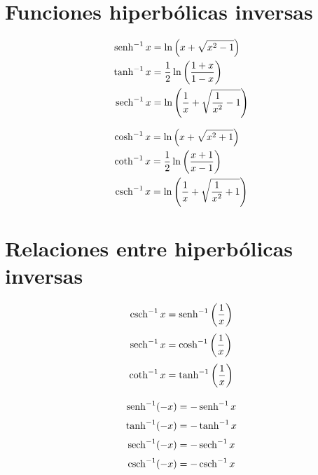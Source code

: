 \newpage

\section*{Funciones hiperbólicas inversas}

\begin{minipage}[c]{0.5\textwidth}
\begin{align*}
\operatorname{senh}^{-1} x &= \ln \left( x+ \sqrt{x^2-1} \right)\\
\tanh^{-1} x &= \frac{1}{2}\ln \left( \frac{1+x}{1-x} \right)\\
\operatorname{sech}^{-1} x &= \ln \left( \frac{1}{x}+ \sqrt{\frac{1}{x^2}-1} \right)
\end{align*}
\end{minipage}\begin{minipage}[c]{0.5\textwidth}
\begin{align*}
\cosh^{-1} x &= \ln \left( x+ \sqrt{x^2+1} \right)\\
\coth^{-1} x &= \frac{1}{2}\ln \left( \frac{x+1}{x-1} \right)\\
\operatorname{csch}^{-1} x &= \ln \left( \frac{1}{x}+ \sqrt{\frac{1}{x^2}+1} \right)
\end{align*}
\end{minipage}

\section*{Relaciones entre hiperbólicas inversas}

\begin{minipage}[t]{0.5\textwidth}
\begin{align*}
 \operatorname{csch}^{-1} x &= \operatorname{senh}^{-1} \left( \frac{1}{x} \right)\\[3pt]
 \operatorname{sech}^{-1} x &= \cosh^{-1} \left( \frac{1}{x} \right)\\[3pt]
 \coth^{-1} x &= \tanh^{-1} \left( \frac{1}{x} \right)\\[3pt]
\end{align*}
\end{minipage} 
\begin{minipage}[t]{0.5\textwidth}
\begin{align*}
 \operatorname{senh}^{-1} (-x) &= -\operatorname{senh}^{-1} x\\[3pt]
 \tanh^{-1} (-x) &= -\tanh^{-1} x\\[3pt]
 \operatorname{sech}^{-1} (-x) &= -\operatorname{sech}^{-1} x\\[3pt]
 \operatorname{csch}^{-1} (-x) &= -\operatorname{csch}^{-1} x
\end{align*}
\end{minipage}


